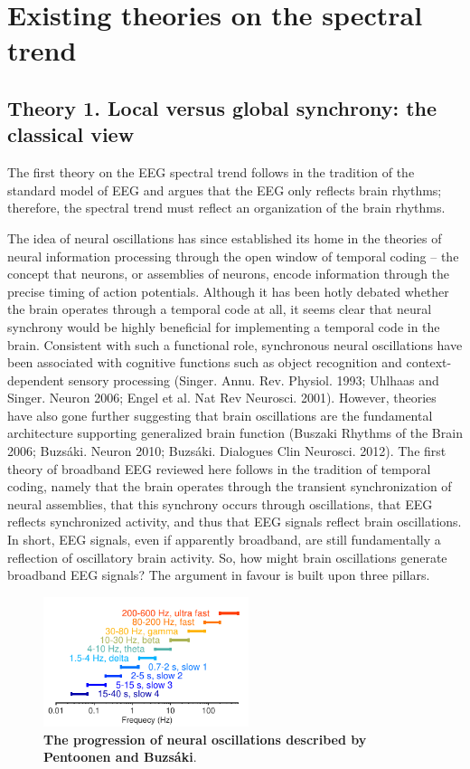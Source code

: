 \section{Existing theories on the spectral trend} \label{sec:theories}

\subsection{Theory 1. Local versus global synchrony: the classical view} \label{sec:all_oscillations}
The first theory on the EEG spectral trend follows in the tradition of the standard model of EEG and argues that the EEG only reflects brain rhythms; therefore, the spectral trend must reflect an organization of the brain rhythms. 

The idea of neural oscillations has since established its home in the theories of neural information processing through the open window of temporal coding – the concept that neurons, or assemblies of neurons, encode information through the precise timing of action potentials. Although it has been hotly debated whether the brain operates through a temporal code at all, it seems clear that neural synchrony would be highly beneficial for implementing a temporal code in the brain. Consistent with such a functional role, synchronous neural oscillations have been associated with cognitive functions such as object recognition and context-dependent sensory processing (Singer. Annu. Rev. Physiol. 1993; Uhlhaas and Singer. Neuron 2006; Engel et al. Nat Rev Neurosci. 2001). However, theories have also gone further suggesting that brain oscillations are the fundamental architecture supporting generalized brain function (Buszaki Rhythms of the Brain 2006; Buzsáki. Neuron 2010; Buzsáki. Dialogues Clin Neurosci. 2012). The first theory of broadband EEG reviewed here follows in the tradition of temporal coding, namely that the brain operates through the transient synchronization of neural assemblies, that this synchrony occurs through oscillations, that EEG reflects synchronized activity, and thus that EEG signals reflect brain oscillations. In short, EEG signals, even if apparently broadband, are still fundamentally a reflection of oscillatory brain activity. So, how might brain oscillations generate broadband EEG signals? The argument in favour is built upon three pillars.

\begin{figure}
\vspace{-10pt}
\centering
\includegraphics[width=60mm]{Figures/chapter1/rhythm_frequencies.pdf}
\caption{\textbf{The progression of neural oscillations described by Pentoonen and Buzsáki}\cite{Penttonen2003}.}  \label{fig:multipole}
\end{figure}

